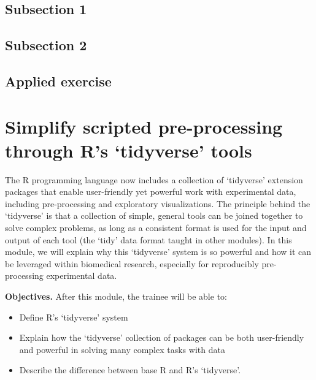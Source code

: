 \documentclass[]{tufte-book}
\providecommand{\tightlist}{%
  \setlength{\itemsep}{0pt}\setlength{\parskip}{0pt}}
\begin{document}
\hypertarget{subsection-1}{%
\subsection{Subsection 1}\label{subsection-1}}

\hypertarget{subsection-2}{%
\subsection{Subsection 2}\label{subsection-2}}

\hypertarget{applied-exercise}{%
\subsection{Applied exercise}\label{applied-exercise}}

\hypertarget{simplify-scripted-pre-processing-through-rs-tidyverse-tools}{%
\section{Simplify scripted pre-processing through R's `tidyverse' tools}\label{simplify-scripted-pre-processing-through-rs-tidyverse-tools}}

The R programming language now includes a collection of `tidyverse' extension
packages that enable user-friendly yet powerful work with experimental data,
including pre-processing and exploratory visualizations. The principle behind
the `tidyverse' is that a collection of simple, general tools can be joined
together to solve complex problems, as long as a consistent format is used for
the input and output of each tool (the `tidy' data format taught in other
modules). In this module, we will explain why this `tidyverse' system is so
powerful and how it can be leveraged within biomedical research, especially for
reproducibly pre-processing experimental data.

\textbf{Objectives.} After this module, the trainee will be able to:

\begin{itemize}
\tightlist
\item
  Define R's `tidyverse' system
\item
  Explain how the `tidyverse' collection of packages can be both user-friendly
  and powerful in solving many complex tasks with data
\item
  Describe the difference between base R and R's `tidyverse'.
\end{itemize}
\end{document}
